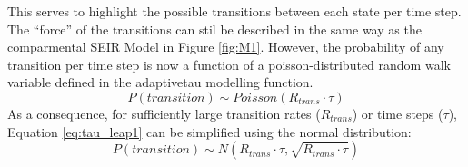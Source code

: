 \documentclass[../Paper.tex]{subfiles}
\begin{document}
This serves to highlight the possible transitions between each state per time
step. The ``force'' of the transitions can stil be described in the same way as the
comparmental SEIR Model in Figure \ref{fig:M1}.
However, the probability of any transition per time step is now a function of a
poisson-distributed random walk variable defined in the adaptivetau modelling function.
\begin{equation} \label{eq:tau_leap1}
P\left ( transition \right )\sim Poisson \left( R_{trans}\cdot\tau \right)
\end{equation}
As a consequence, for sufficiently large transition rates ($R_{trans}$) or time steps ($\tau$),
Equation \ref{eq:tau_leap1} can be simplified using the normal distribution:
\begin{equation} \label{eq:tau_leap2}
P\left( transition \right)\sim N \left( R_{trans}\cdot\tau, \sqrt{R_{trans}\cdot\tau} \right)
\end{equation}

\clearpage
\end{document}
